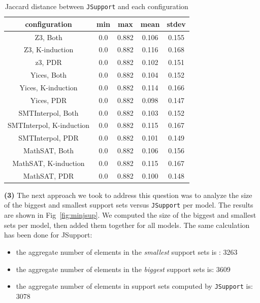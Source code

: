 \begin{table}
  \centering
  \begin{tabular}{|c|c|c|c|c|}
    \hline
    configuration & min & max & mean & stdev \\[0.5ex]
    \hline\hline
    Z3, Both & 0.0 & 0.882 & 0.106 & 0.155 \\[0.5ex]
    Z3, K-induction & 0.0 & 0.882 & 0.116 & 0.168 \\[0.5ex]
    z3, PDR & 0.0 & 0.882 & 0.102 & 0.151 \\[0.5ex]
    \hline
    Yices, Both & 0.0 & 0.882 & 0.104 & 0.152 \\[0.5ex]
    Yices, K-induction & 0.0 & 0.882 & 0.114 & 0.166 \\[0.5ex]
    Yices, PDR & 0.0 & 0.882 & 0.098 & 0.147 \\[0.5ex]
    \hline
    SMTInterpol, Both & 0.0 & 0.882 & 0.103 & 0.152 \\[0.5ex]
    SMTInterpol, K-induction & 0.0 & 0.882 & 0.115 & 0.167 \\[0.5ex]
    SMTInterpol, PDR & 0.0 & 0.882 & 0.101 & 0.149 \\[0.5ex]
    \hline
    MathSAT, Both & 0.0 & 0.882 & 0.106 & 0.156 \\[0.5ex]
    MathSAT, K-induction & 0.0 & 0.882 & 0.115 & 0.167 \\[0.5ex]
    MathSAT, PDR & 0.0 & 0.882 & 0.100 & 0.148 \\[0.5ex]
    \hline
  \end{tabular}
  \caption{\small{Jaccard distance between \texttt{JSupport} and each configuration}}\label{tab:jsupconf}
\end{table}

\vspace{6pt}
\noindent{}
 \vspace{9pt}

\textbf{(3)} The next approach we took to address this question was to analyze the size of the biggest and smallest support sets versus \texttt{JSupport} per model. The results are shown in Fig~\ref{fig:minjsup}.
We computed the size of the biggest and smallest sets per model, then added them together for all models. The same calculation has been done for JSupport:
\begin{itemize}
  \item the aggregate number of elements in the \emph{smallest} support sets is : 3263
  \item the aggregate number of elements in the \emph{biggest} support sets is: 3609
  \item the aggregate number of elements in support sets computed by \texttt{JSupport} is: 3078
\end{itemize}


